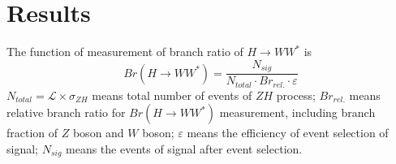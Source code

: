 \documentclass[11pt,a4paper]{cepcnote}
\begin{document}
%
%



%
%


%
%
\section{Results}
The function of measurement of branch ratio of $H\rightarrow WW^*$ is 
\begin{equation*}
Br(H\rightarrow WW^*) = \frac{N_{sig}}{N_{total} \cdot Br_{rel.} \cdot \varepsilon}
\end{equation*}
$N_{total}=\mathcal{L}\times\sigma_{ZH}$ means total number of events of $ZH$ process; $Br_{rel.}$ means relative branch ratio for 
$Br(H\rightarrow WW^*)$ measurement, including branch fraction of $Z$ boson and $W$ boson; $\varepsilon$ means the efficiency of 
event selection of signal; $N_{sig}$ means the events of signal after event selection.
\end{document}
